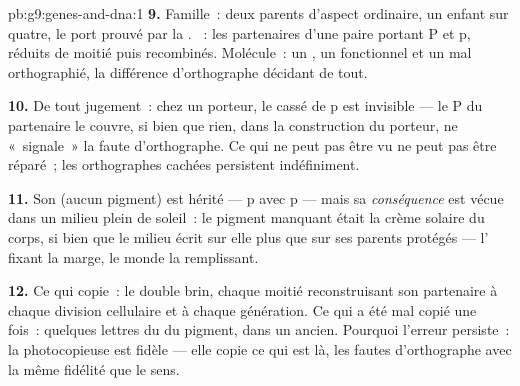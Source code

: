 \begin{solution}{pb:g9:genes-and-dna:1}
\textbf{9.} Famille~: deux parents d'aspect ordinaire, un
enfant sur quatre, le port prouvé par la .
~: les partenaires d'une paire portant P et p,
réduits de moitié puis recombinés. Molécule~: un , un
 fonctionnel et un  mal orthographié, la
différence d'orthographe décidant de tout.

\textbf{10.} De tout jugement~: chez un porteur, le cassé de
p est invisible --- le P du partenaire le couvre, si bien
que rien, dans la construction du porteur, ne «~signale~» la
faute d'orthographe. Ce qui ne peut pas être vu ne peut pas
être réparé~; les orthographes cachées persistent
indéfiniment.

\textbf{11.} Son  (aucun pigment) est hérité --- p
avec p --- mais sa \emph{conséquence} est vécue dans un
milieu plein de soleil~: le pigment manquant était la crème
solaire du corps, si bien que le milieu écrit sur elle plus
que sur ses parents protégés --- l' fixant la marge,
le monde la remplissant.

\textbf{12.} Ce qui copie~: le double brin, chaque moitié
reconstruisant son partenaire à chaque division cellulaire
et à chaque génération. Ce qui a été mal copié une fois~:
quelques lettres du  du pigment, dans un  ancien.
Pourquoi l'erreur persiste~: la photocopieuse est fidèle ---
elle copie ce qui est là, les fautes d'orthographe avec la
même fidélité que le sens.
\end{solution}
